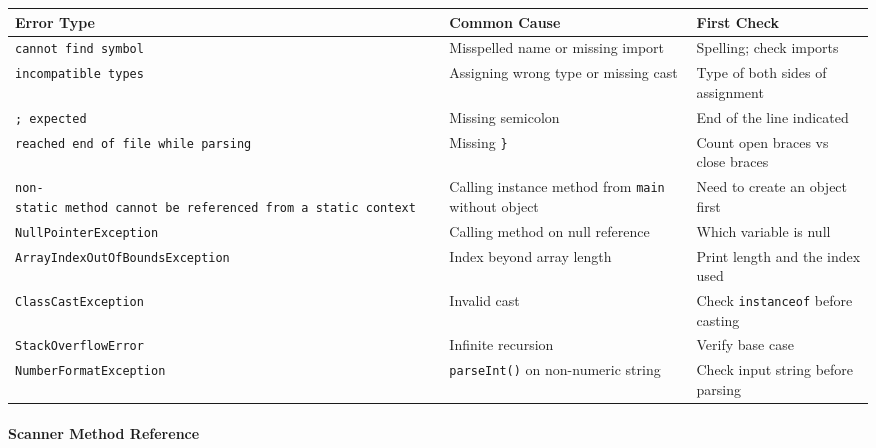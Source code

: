 \documentclass[
  justified,
  openright,
]{tufte-book}
\let\subsubsection\paragraph
\let\paragraph\paragraph
\let\subsubsection\paragraph
\let\paragraph\paragraph
\begin{document}
{\def\LTcaptype{none} %
\begin{longtable}[]{@{}
  >{\raggedright\arraybackslash}p{}
  >{\raggedright\arraybackslash}p{}
  >{\raggedright\arraybackslash}p{}@{}}
\toprule\noalign{}
\begin{minipage}[b]{\linewidth}\raggedright
Error Type
\end{minipage} & \begin{minipage}[b]{\linewidth}\raggedright
Common Cause
\end{minipage} & \begin{minipage}[b]{\linewidth}\raggedright
First Check
\end{minipage} \\
\midrule\noalign{}
\endhead
\bottomrule\noalign{}
\endlastfoot
\texttt{cannot\ find\ symbol} & Misspelled name or missing import &
Spelling; check imports \\
\texttt{incompatible\ types} & Assigning wrong type or missing cast &
Type of both sides of assignment \\
\texttt{\textquotesingle{};\textquotesingle{}\ expected} & Missing
semicolon & End of the line indicated \\
\texttt{reached\ end\ of\ file\ while\ parsing} & Missing \texttt{\}} &
Count open braces vs close braces \\
\texttt{non-static\ method\ cannot\ be\ referenced\ from\ a\ static\ context}
& Calling instance method from \texttt{main} without object & Need to
create an object first \\
\texttt{NullPointerException} & Calling method on null reference & Which
variable is null \\
\texttt{ArrayIndexOutOfBoundsException} & Index beyond array length &
Print length and the index used \\
\texttt{ClassCastException} & Invalid cast & Check \texttt{instanceof}
before casting \\
\texttt{StackOverflowError} & Infinite recursion & Verify base case \\
\texttt{NumberFormatException} & \texttt{parseInt()} on non-numeric
string & Check input string before parsing \\
\end{longtable}
}

\subsubsection{Scanner Method Reference}\label{scanner-method-reference}
\end{document}
